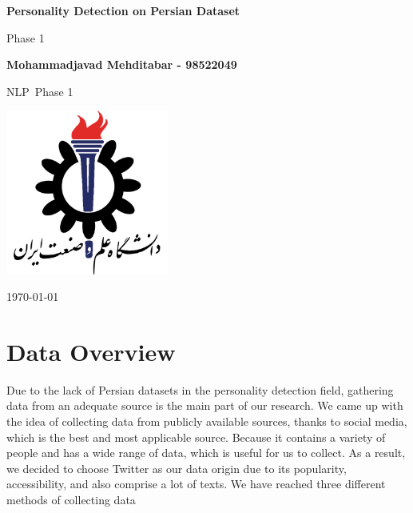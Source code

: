 \documentclass[10pt, a4paper]{article}
\newcommand\course{NLP}                            %
\newcommand\hwnumber{1}                                 %
\newcommand\Information{Mohammadjavad Mehditabar - 98522049}                        %
\begin{document}
\begin{titlepage}
    \begin{center}
        \vspace*{3cm}

        \Huge
        \textbf{Personality Detection on Persian Dataset}

        \vspace{1cm}
        \huge
        Phase \hwnumber

        \vspace{1.5cm}
        \Large

        \textbf{\Information}                      %


        \vfill

        \course \ Phase \hwnumber

        \vspace{1cm}

        \includegraphics[width=0.4\textwidth]{images/iust-logo.png}
        \\

        \Large

        \today

    \end{center}
\end{titlepage}

\newpage

\vspace*{0.1cm}

\tableofcontents

\newpage
\section{Data Overview}
Due to the lack of Persian datasets in the personality detection
field, gathering data from an adequate source is the main part of
our research. We came up with the idea of collecting data from
publicly available sources, thanks to social media, which is the best
and most applicable source. Because it contains a variety of people
and has a wide range of data, which is useful for us to collect. As a
result, we decided to choose Twitter as our data origin due to its
popularity, accessibility, and also comprise a lot of texts. We have
reached three different methods of collecting data
\end{document}

